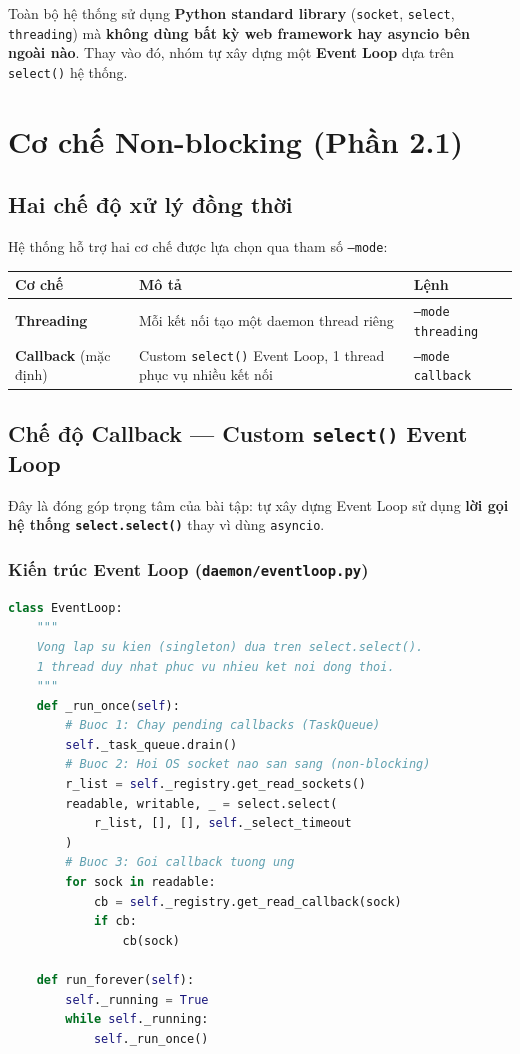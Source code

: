 \documentclass[12pt,a4paper]{article}
\begin{document}
Toàn bộ hệ thống sử dụng \textbf{Python standard library} (\texttt{socket}, \texttt{select}, \texttt{threading}) mà \textbf{không dùng bất kỳ web framework hay asyncio bên ngoài nào}. Thay vào đó, nhóm tự xây dựng một \textbf{Event Loop} dựa trên \texttt{select()} hệ thống.

\section{Cơ chế Non-blocking (Phần 2.1)}

\subsection{Hai chế độ xử lý đồng thời}

Hệ thống hỗ trợ hai cơ chế được lựa chọn qua tham số \texttt{--mode}:

\begin{longtable}{|p{4cm}|p{6.5cm}|p{4.5cm}|}
\hline
\textbf{Cơ chế} & \textbf{Mô tả} & \textbf{Lệnh} \\ \hline
\textbf{Threading} & Mỗi kết nối tạo một daemon thread riêng & \texttt{--mode threading} \\ \hline
\textbf{Callback} (mặc định) & Custom \texttt{select()} Event Loop, 1 thread phục vụ nhiều kết nối & \texttt{--mode callback} \\ \hline
\end{longtable}

\subsection{Chế độ Callback --- Custom \texttt{select()} Event Loop}

Đây là đóng góp trọng tâm của bài tập: tự xây dựng Event Loop sử dụng \textbf{lời gọi hệ thống \texttt{select.select()}} thay vì dùng \texttt{asyncio}.

\subsubsection*{Kiến trúc Event Loop (\texttt{daemon/eventloop.py})}

\begin{lstlisting}[language=Python, caption={EventLoop --- vòng lặp sự kiện tự xây}]
class EventLoop:
    """
    Vong lap su kien (singleton) dua tren select.select().
    1 thread duy nhat phuc vu nhieu ket noi dong thoi.
    """
    def _run_once(self):
        # Buoc 1: Chay pending callbacks (TaskQueue)
        self._task_queue.drain()
        # Buoc 2: Hoi OS socket nao san sang (non-blocking)
        r_list = self._registry.get_read_sockets()
        readable, writable, _ = select.select(
            r_list, [], [], self._select_timeout
        )
        # Buoc 3: Goi callback tuong ung
        for sock in readable:
            cb = self._registry.get_read_callback(sock)
            if cb:
                cb(sock)

    def run_forever(self):
        self._running = True
        while self._running:
            self._run_once()
\end{lstlisting}
\end{document}
